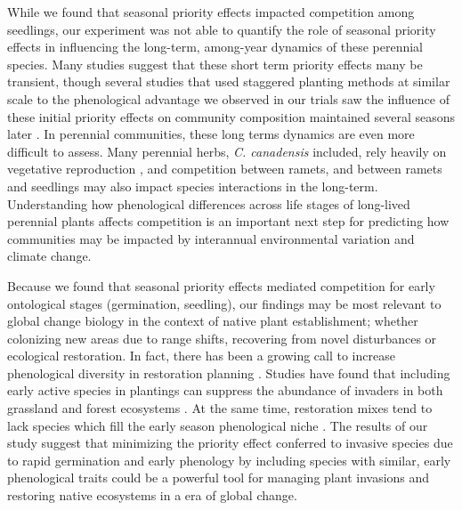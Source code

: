 \documentclass{article}[11pt]
\begin{document}
While we found that seasonal priority effects impacted competition among seedlings, our experiment was not able to quantify the role of seasonal priority effects in influencing the long-term, among-year dynamics of these perennial species. %
Many studies suggest that these short term priority effects many be transient, though several studies that used staggered planting methods at similar scale to the phenological advantage we observed in our trials saw the influence of these initial priority effects on community composition maintained several seasons later \citep{Vaughn:2015wp,Young:2017aa,Torrez:2017to}. In perennial communities, these long terms dynamics are even more difficult to assess. Many perennial herbs, \textit{C. canadensis} included, rely heavily on vegetative reproduction \citep{Hawkins:2005ve}, and competition between ramets, and between ramets and seedlings may also impact species interactions in the long-term. %
Understanding how phenological differences across life stages of long-lived perennial plants affects competition is an important next step for predicting how communities may be impacted by interannual environmental variation and climate change.

Because we found that seasonal priority effects mediated competition for early ontological stages (germination, seedling), our findings may be most relevant to global change biology in the context of native plant establishment; whether colonizing new areas due to range shifts, recovering from novel disturbances or ecological restoration. In fact, there has been a growing call to increase phenological diversity in restoration planning \citep{Hess:2019vn}. Studies have found that including early active species in plantings can suppress the abundance of invaders in both grassland \citep{Cleland:2013wo} and forest ecosystems \citep{Schuster:2020ww}. At the same time, restoration mixes tend to lack species which fill the early season phenological niche \citep{Havens:2016vo}. The results of our study suggest that minimizing the priority effect conferred to invasive species due to rapid germination and early phenology by including species with similar, early phenological traits could be a powerful tool for managing plant invasions and restoring native ecosystems in a era of global change.
\end{document}
